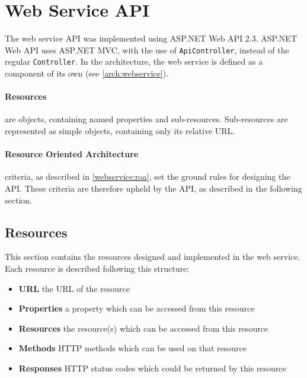 \section{Web Service API}\label{design:web_service}
The web service API was implemented using ASP.NET Web API 2.3\cite{aspnet_webapi}.
ASP.NET Web API uses ASP.NET MVC\cite{aspnet_mvc}, with the use of \texttt{ApiController}, instead of the regular \texttt{Controller}.
In the architecture, the web service is defined as a component of its own (see \cref{arch:webservice}).

\paragraph{Resources} are objects, containing named properties and sub-resources.
Sub-resources are represented as simple objects, containing only its relative URL.



\paragraph{Resource Oriented Architecture} criteria, as described in \cref{webservice:roa}, set the ground rules for designing the API.
These criteria are therefore upheld by the API, as described in the following section.

\subsection{Resources}\label{webservice:resources}
This section contains the resources designed and implemented in the web service.
Each resource is described following this structure:
\begin{itemize}
\item \textbf{URL} the URL of the resource
\item \textbf{Properties} a property which can be accessed from this resource
\item \textbf{Resources} the resource(s) which can be accessed from this resource
\item \textbf{Methods} HTTP methods which can be used on that resource
\item \textbf{Responses} HTTP status codes which could be returned by this resource
\end{itemize}

